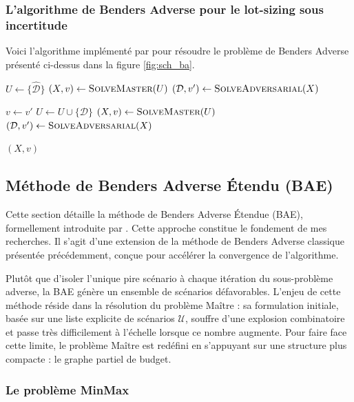 \documentclass[12pt, a4paper, twoside]{report}
\numberwithin{equation}{section}
\newcommand{\mmx}{\textbf{MinMax} }
\begin{document}
	\subsubsection{L'algorithme de Benders Adverse pour le lot-sizing sous incertitude}
	
	Voici l'algorithme implémenté par \cite{portoleau:tel-04631599} pour résoudre le problème de Benders Adverse présenté ci-dessus dans la figure \ref{fig:sch_ba}.
	
	\begin{algorithm}[H]
		\caption{Adversarial Benders Method}
		\label{alg:benders_algo}
		\begin{algorithmic}[1]
			\State $U \gets \{\hat{\mathcal{D}}\}$
			\State $(X,v) \gets \Call{SolveMaster}{U}$
			\State $(\mathcal{D},v') \gets \Call{SolveAdversarial}{X}$
			
			\State $v \gets v'$
			\State $U \gets U \cup \{\mathcal{D}\}$
			\State $(X,v) \gets \Call{SolveMaster}{U}$
			\State $(\mathcal{D},v') \gets \Call{SolveAdversarial}{X}$
			\EndWhile
			
			\State \Return $(X,v)$
		\end{algorithmic}
	\end{algorithm}
	
	\subsection{Méthode de Benders Adverse Étendu (BAE)}
	
	Cette section détaille la méthode de Benders Adverse Étendue (BAE), formellement introduite par \cite{portoleau:tel-04631599}. Cette approche constitue le fondement de mes recherches. Il s'agit d'une extension de la méthode de Benders Adverse classique présentée précédemment, conçue pour accélérer la convergence de l'algorithme.
	
	Plutôt que d'isoler l'unique pire scénario à chaque itération du sous-problème adverse, la BAE génère un ensemble de scénarios défavorables. L'enjeu de cette méthode réside dans la résolution du problème Maître : sa formulation initiale, basée sur une liste explicite de scénarios  $\mathcal{U}$, souffre d'une explosion combinatoire et passe très difficilement à l'échelle lorsque ce nombre augmente. Pour faire face cette limite, le problème Maître est redéfini en s'appuyant sur une structure plus compacte : le graphe partiel de budget.
	
	\subsubsection{Le problème \mmx}
	
\end{document}
